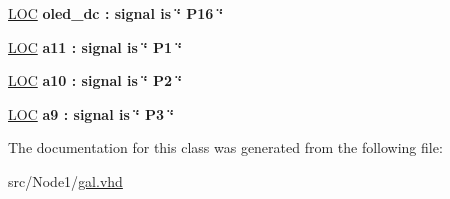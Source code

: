\begin{DoxyCompactItemize}
\item 
\hyperlink{classaddress__decoder_abde2e9cf9b5462385a548804bc3b9117}{L\+OC} {\bfseries \textcolor{vhdlchar}{oled\+\_\+dc}\textcolor{vhdlchar}{ }\textcolor{vhdlchar}{\+:}\textcolor{vhdlchar}{ }\textcolor{vhdlchar}{signal}\textcolor{vhdlchar}{ }\textcolor{vhdlchar}{is}\textcolor{vhdlchar}{ }\textcolor{keyword}{\char`\"{} P16 \char`\"{}}\textcolor{vhdlchar}{ }} \hypertarget{classaddress__decoder_abde2e9cf9b5462385a548804bc3b9117}{}\label{classaddress__decoder_abde2e9cf9b5462385a548804bc3b9117}

\item 
\hyperlink{classaddress__decoder_ac82a926fe309ed97b3c2add6ce0fdf5a}{L\+OC} {\bfseries \textcolor{vhdlchar}{a11}\textcolor{vhdlchar}{ }\textcolor{vhdlchar}{\+:}\textcolor{vhdlchar}{ }\textcolor{vhdlchar}{signal}\textcolor{vhdlchar}{ }\textcolor{vhdlchar}{is}\textcolor{vhdlchar}{ }\textcolor{keyword}{\char`\"{} P1 \char`\"{}}\textcolor{vhdlchar}{ }} \hypertarget{classaddress__decoder_ac82a926fe309ed97b3c2add6ce0fdf5a}{}\label{classaddress__decoder_ac82a926fe309ed97b3c2add6ce0fdf5a}

\item 
\hyperlink{classaddress__decoder_ab927fd29cd7cd94e2d02041a23240988}{L\+OC} {\bfseries \textcolor{vhdlchar}{a10}\textcolor{vhdlchar}{ }\textcolor{vhdlchar}{\+:}\textcolor{vhdlchar}{ }\textcolor{vhdlchar}{signal}\textcolor{vhdlchar}{ }\textcolor{vhdlchar}{is}\textcolor{vhdlchar}{ }\textcolor{keyword}{\char`\"{} P2 \char`\"{}}\textcolor{vhdlchar}{ }} \hypertarget{classaddress__decoder_ab927fd29cd7cd94e2d02041a23240988}{}\label{classaddress__decoder_ab927fd29cd7cd94e2d02041a23240988}

\item 
\hyperlink{classaddress__decoder_ae14a84443d33e6a9ea1f4b78fe2c6b22}{L\+OC} {\bfseries \textcolor{vhdlchar}{a9}\textcolor{vhdlchar}{ }\textcolor{vhdlchar}{\+:}\textcolor{vhdlchar}{ }\textcolor{vhdlchar}{signal}\textcolor{vhdlchar}{ }\textcolor{vhdlchar}{is}\textcolor{vhdlchar}{ }\textcolor{keyword}{\char`\"{} P3 \char`\"{}}\textcolor{vhdlchar}{ }} \hypertarget{classaddress__decoder_ae14a84443d33e6a9ea1f4b78fe2c6b22}{}\label{classaddress__decoder_ae14a84443d33e6a9ea1f4b78fe2c6b22}

\end{DoxyCompactItemize}


The documentation for this class was generated from the following file\+:\begin{DoxyCompactItemize}
\item 
src/\+Node1/\hyperlink{gal_8vhd}{gal.\+vhd}\end{DoxyCompactItemize}
